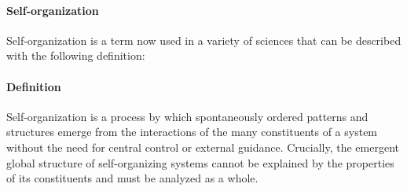 \paragraph{Self-organization}

Self-organization is a term now used in a variety of sciences that can be described with the following definition:
\begin{tcolorbox}
\small
\paragraph{Definition}
\gls{Self-organization} is a process by which spontaneously ordered patterns and structures emerge from the interactions of the many constituents of a system without the need for central control or external guidance. Crucially, the emergent global structure of self-organizing systems cannot be explained by the properties of its constituents and must be analyzed as a whole.
\end{tcolorbox}

